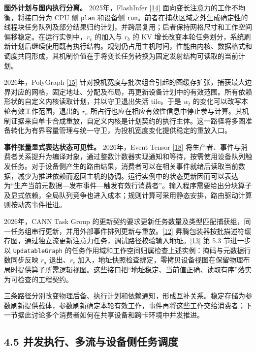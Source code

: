\documentclass[UTF8,10.5pt,fontset=windows]{ctexart}
\begin{document}
\textbf{图外计划与图内执行分离。} 2025年，FlashInfer
{[}\protect\hyperlink{ref-ye2025flashinfer}{14}{]}
面向变长注意力的工作不均衡，将接口分为 CPU 侧 \nolinkurl{plan} 和设备侧
\nolinkurl{run}。前者在捕获区域之外生成确定性的线程块任务队列及部分结果归约计划，并跨层复用；后者保持网格尺寸和工作空间偏移稳定。在运行实例中，\(r_c\)
的加入与 \(r_b\) 的 KV
增长改变本轮任务划分，系统刷新计划后继续使用既有执行结构。规划仍占用主机时间，性能由内核、数据格式和调度共同形成，其机制价值在于将变长任务转换为固定发射结构可读取的当前计划。

2026年，PolyGraph {[}\protect\hyperlink{ref-yang2026polygraph}{15}{]}
针对投机宽度与批次组合引起的图缓存扩张，捕获最大边界对应的网格，固定地址、分配及布局，再更新设备计划中的有效范围。所有依赖形状的自定义内核读取计划，并以守卫退出失活
tile。于是 \(w_t\) 的变化可以改写本轮有效工作范围，退出的 \(r_a\)
所占行也应在相应有效性信息中停止参与计算。其机制证据来自单卡合成重放，自定义内核是计划契约的执行主体。这一路径将多图准备转化为有界容量管理与统一守卫，为投机宽度变化提供稳定的重放入口。

\textbf{事件张量显式表达状态可见性。} 2026年，Event Tensor
{[}\protect\hyperlink{ref-jin2026eventtensor}{18}{]}
将生产者、事件与消费者关系提升为编译对象，通过整数计数器实现通知和等待，按需使用设备队列触发任务。对于设备侧产生的路由结果，消费者可以在相关事件就绪后读取当前数据，减少为推进依赖而返回主机的协调。运行实例中的状态更新因而可以表达为``生产当前元数据---发布事件---触发有效行消费者''。输入程序需要给出分块算子及显式依赖，全局队列竞争也进入成本；规则计算可采用静态安排，路由驱动计算则按动态事件推进。

2026年，CANN Task Group
的更新契约要求更新任务数量及类型匹配捕获组，同一任务组串行更新，并用外部事件排列更新与重放。{[}\protect\hyperlink{ref-cann910update}{12}{]}
昇腾包装器按批描述符缓存图，通过独立流更新注意力任务，调试路径校验输入地址。{[}\protect\hyperlink{ref-vllmascend0130impl}{13}{]}
第 5.3 节进一步以 \nolinkurl{UpdatableGraph}
的任务作用域和工作空间归属检查上述实例：掩码与元数据行数同步反映 \(r_a\)
退出、\(r_c\)
加入，地址快照检查绑定，零拷贝设备视图在保留物理布局时提供算子所需逻辑视图。这些接口把``地址稳定、当前值正确、读取有序''落实为可检查的工程契约。

三条路径分别改变物理后备、执行计划和依赖通知，形成互补关系。稳定存储为参数刷新提供载体，参数刷新确定本轮有效工作，事件再将这些工作交给消费者；下一节据此讨论多个消费者如何在共享设备和跨卡环境中并发推进。

\hypertarget{section-4-5}{%
\subsection{4.5 并发执行、多流与设备侧任务调度}\label{section-4-5}}
\end{document}
